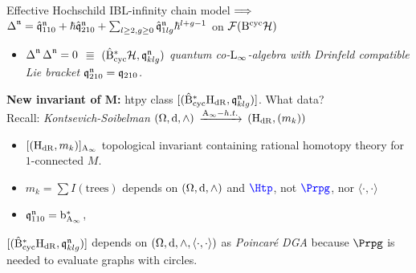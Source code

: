 \documentclass[xcolor=dvipsnames]{beamer}
\theoremstyle{plain}
\renewcommand{\emph}[1]{{\itshape\color{pink}#1}}
\newcommand{\emphbf}[1]{{\bfseries\color{YellowGreen}#1}}
\begin{document}
\begin{frame}{Effective Hochschild IBL-infinity chain model}
$\Longrightarrow$ $\operatorname{\Delta}^{{\mathfrak{n}}} = \hat{\mathfrak{q}}^{{\mathfrak{n}}}_{110}  +  \hbar \hat{\mathfrak{q}}_{210}^{\mathfrak{n}} + \sum_{l\ge 2, g\ge 0} \hat{\mathfrak{q}}^{{\mathfrak{n}}}_{1lg} \hbar^{l+g-1}$ on $\mathcal{F}(\mathrm{B}^{\mathrm{cyc}} \mathcal{H})$ \\ 
\begin{itemize}
\item $\operatorname{\Delta}^{{\mathfrak{n}}}\operatorname{\Delta}^{{\mathfrak{n}}} = 0$ $\Equiv$ $(\hat{\mathrm{B}}_{\mathrm{cyc}}^* \mathcal{H},\mathfrak{q}_{klg}^{\mathfrak{n}})$ \emph{quantum co-$\mathrm{L}_\infty$-algebra with Drinfeld compatible Lie bracket $\mathfrak{q}_{210}^{\mathfrak{n}} = \mathfrak{q}_{210}$.}
\end{itemize}\pause\vspace{.3cm}
\emphbf{New invariant of $\mathbf{M}$:} htpy class $[(\hat{\mathrm{B}}_{\mathrm{cyc}}^* \mathrm{H}_{\mathrm{dR}}, \mathfrak{q}_{klg}^{\mathfrak{n}})]$. What data?\\\pause\vspace{.3cm}
Recall: \emph{Kontsevich-Soibelman} $(\Omega,\mathrm{d},\wedge)$ $\xrightarrow{\mathrm{A}_\infty-h.t.}$ $(\mathrm{H}_{\mathrm{dR}},(m_k))$
\begin{itemize}
\item $[(\mathrm{H}_{\mathrm{dR}}, m_k)]_{\mathrm{A}_\infty}$ topological invariant containing rational homotopy theory for $1$-connected $M$.
\item $m_k = \sum I(\text{trees})$ depends on $(\Omega,\mathrm{d},\wedge)$ and $\color{blue}\Htp$, not $\color{blue}\Prpg$, nor $\langle\cdot,\cdot\rangle$
\item $\mathfrak{q}_{110}^{\mathfrak{n}} = \mathrm{b}_{\mathrm{A}_\infty}^*$, 
\end{itemize}\pause
\vspace{.3cm}
$[(\hat{\mathrm{B}}_{\mathrm{cyc}}^* \mathrm{H}_{\mathrm{dR}}, \mathfrak{q}_{klg}^{\mathfrak{n}})]$ depends on $(\Omega,\mathrm{d},\wedge,\langle\cdot,\cdot\rangle)$ as \emph{Poincar\'e DGA} because $\Prpg$ is needed to evaluate graphs with circles.
\end{frame}
\end{document}
